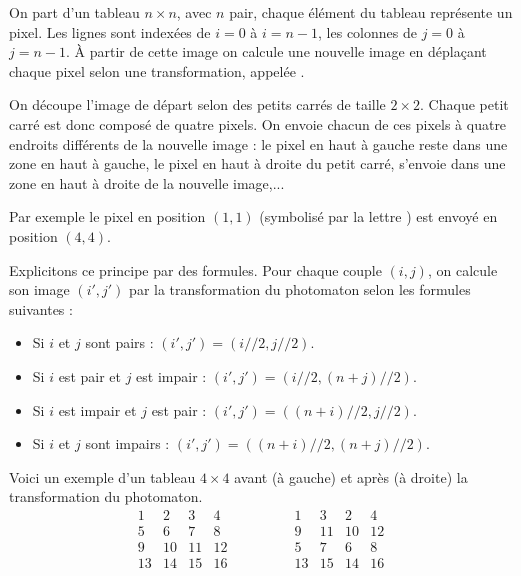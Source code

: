 \documentclass[11pt,class=report,crop=false]{standalone}
\begin{document}
\begin{cours}

On part d'un tableau $n\times n$, avec $n$ pair, chaque élément du tableau représente un pixel. Les lignes sont indexées de $i=0$ à $i=n-1$, les colonnes de $j=0$ à $j=n-1$.
À partir de cette image on calcule une nouvelle image en déplaçant chaque pixel selon une transformation, appelée .

On découpe l'image de départ selon des petits carrés de taille $2\times2$.
Chaque petit carré est donc composé de quatre pixels. On envoie chacun de ces pixels à quatre endroits différents de la nouvelle image :
le pixel en haut à gauche reste dans une zone en haut à gauche, le pixel en haut à droite du petit carré, s'envoie dans une zone en haut à droite de la nouvelle image,...


Par exemple le pixel en position $(1,1)$ (symbolisé par la lettre ) est envoyé en position $(4,4)$.

\medskip

Explicitons ce principe par des formules. Pour chaque couple $(i,j)$, on calcule son image $(i',j')$ par la transformation du photomaton selon les formules suivantes :
\begin{itemize}
  \item Si $i$ et $j$ sont pairs : $(i',j') = (i//2,j//2)$.
  \item Si $i$ est pair et $j$ est impair : $(i',j') = (i//2,(n+j)//2)$.  
  \item Si $i$ est impair et $j$ est pair : $(i',j') = ((n+i)//2,j//2)$.
  \item Si $i$ et $j$ sont impairs : $(i',j') = ((n+i)//2,(n+j)//2)$.
\end{itemize}


\medskip

Voici un exemple d'un tableau $4\times 4$ avant (à gauche) et après (à droite) la transformation du photomaton. 
$$\begin{array}{cccc} 
  1& 2& 3& 4\\ 
  5& 6& 7& 8\\  
  9&10&11&12\\  
 13&14&15&16  
\end{array}\qquad\qquad  
\begin{array}{cccc} 
  1& 3& 2& 4\\  
  9&11&10&12\\  
  5& 7& 6& 8\\  
 13&15&14&16
\end{array}$$


\end{cours}
\end{document}
